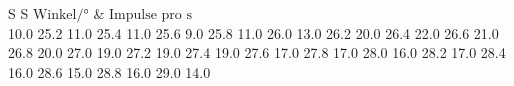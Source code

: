 \begin{table}[H]
  \centering
  \caption{Messwerte des Absorptionsspektrums von Brom}
  \label{tab:tabebrom}
    \begin{tabular}{S S}
    \toprule
    $ \text{Winkel} / ° $ & $ \text{Impulse pro s}$\\
    	10.0
    25.2	11.0
    25.4	11.0
    25.6	9.0
    25.8	11.0
    26.0	13.0
    26.2	20.0
    26.4	22.0
    26.6	21.0
    26.8	20.0
    27.0	19.0
    27.2	19.0
    27.4	19.0
    27.6	17.0
    27.8	17.0
    28.0	16.0
    28.2	17.0
    28.4	16.0
    28.6	15.0
    28.8	16.0
    29.0	14.0

          \bottomrule
        \end{tabular}
    \end{table}
